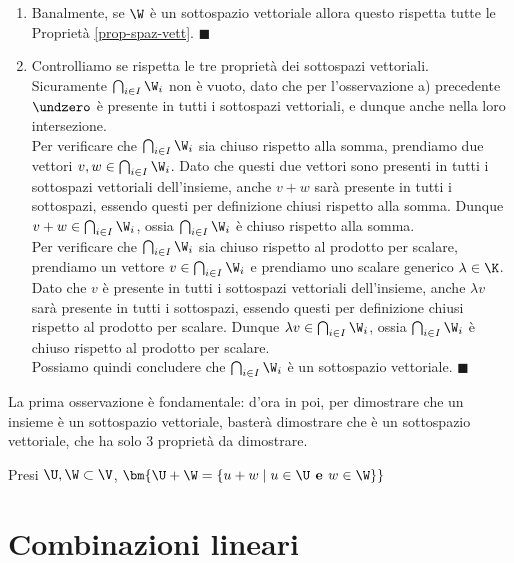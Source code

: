 \documentclass[11pt, a4paper, titlepage, oneside]{scrbook}
\begin{document}
\begin{enumerate}
    \item Banalmente, se $\W$ è un sottospazio vettoriale allora questo rispetta tutte le Proprietà \ref{prop-spaz-vett}. $\blacksquare$
    \item Controlliamo se rispetta le tre proprietà dei sottospazi vettoriali. \\
    Sicuramente $\bigcap_{i \in I} \W_i$ non è vuoto, dato che per l'osservazione a) precedente $\undzero$ è presente in tutti i sottospazi vettoriali, e dunque anche nella loro intersezione. \\
    Per verificare che $\bigcap_{i \in I} \W_i$ sia chiuso rispetto alla somma, prendiamo due vettori \mbox{$v,w \in \bigcap_{i \in I} \W_i$}. Dato che questi due vettori sono presenti in tutti i sottospazi vettoriali dell'insieme, anche $v + w$ sarà presente in tutti i sottospazi, essendo questi per definizione chiusi rispetto alla somma. Dunque $v + w \in \bigcap_{i \in I} \W_i$, ossia $\bigcap_{i \in I} \W_i$ è chiuso rispetto alla somma. \\
    Per verificare che $\bigcap_{i \in I} \W_i$ sia chiuso rispetto al prodotto per scalare, prendiamo un vettore $v \in \bigcap_{i \in I} \W_i$ e prendiamo uno scalare generico $\lambda \in \K$. Dato che $v$ è presente in tutti i sottospazi vettoriali dell'insieme, anche $\lambda v$ sarà presente in tutti i sottospazi, essendo questi per definizione chiusi rispetto al prodotto per scalare. Dunque $\lambda v \in \bigcap_{i \in I} \W_i$, ossia $\bigcap_{i \in I} \W_i$ è chiuso rispetto al prodotto per scalare. \\
    Possiamo quindi concludere che $\bigcap_{i \in I} \W_i$ è un sottospazio vettoriale. $\blacksquare$
\end{enumerate} 

La prima osservazione è fondamentale: d'ora in poi, per dimostrare che un insieme è un sottospazio vettoriale, basterà dimostrare che è un sottospazio vettoriale, che ha solo 3 proprietà da dimostrare.

\begin{Definizione}
\label{def-somm-sott-vett}
Presi $\U,\W \subset \V$, $\bm{\U + \W = \{u + w \mid u \in \U \textbf{ e } w \in \W\}}$
\end{Definizione}

\section{Combinazioni lineari}
\end{document}
